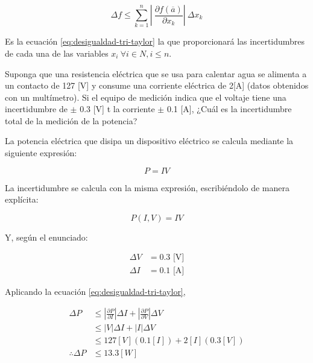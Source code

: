 \begin{equation} \label{eq:desigualdad-tri-taylor}
    \Delta f \leq \sum_{k=1}^{n} \left |\ 
        \frac{\partial f(\overline{a})}{\partial x_k} \right| \
        \Delta x_k
\end{equation}

Es la ecuación \ref{eq:desigualdad-tri-taylor} la que proporcionará las
incertidumbres de cada una de las variables $x_i\ \forall i \in N, i \leq n$.

\begin{ex}

    Suponga que una resistencia eléctrica que se usa para calentar agua se
    alimenta a un contacto de 127 [V] y consume una corriente eléctrica de
    2[A] (datos obtenidos con un multímetro). Si el equipo de medición
    indica que el voltaje tiene una incertidumbre de $\pm$ 0.3 [V] t la
    corriente $\pm$ 0.1 [A], ¿Cuál es la incertidumbre total de la medición de
    la potencia?

    \begin{solution}
        La potencia eléctrica que disipa un dispositivo eléctrico se
        calcula mediante la siguiente expresión:

        \begin{equation*}
            P = IV
        \end{equation*}

        La incertidumbre se calcula con la misma expresión,
        escribiéndolo de manera explícita:

        \begin{equation*}
            P(I, V) = IV
        \end{equation*}

        Y, según el enunciado:

        \begin{align*}
            \Delta V &= 0.3 \text{ [V]} \\
            \Delta I &= 0.1 \text{ [A]}
        \end{align*}


        Aplicando la ecuación \ref{eq:desigualdad-tri-taylor},

        \begin{align*}
            \Delta P &\leq
            \left| \frac{\partial P}{\partial I} \right| \Delta I +
            \left| \frac{\partial P}{\partial V} \right| \Delta V \\
                 &\leq \left| V \right| \Delta I + \left| I\right|
                 \Delta V \\
                 &\leq 127 [V](0.1 [I]) + 2 [I](0.3 [V]) \\
            \therefore \Delta P &\leq 13.3 [W]
        \end{align*}
    \end{solution}
\end{ex}


